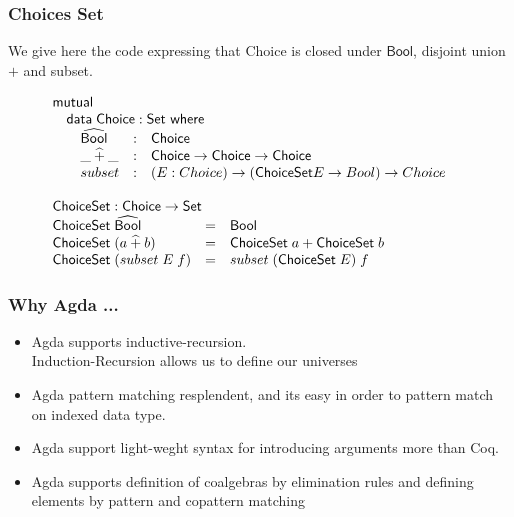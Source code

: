 \documentclass{beamer}
\newcommand{\ar}{\rightarrow}
\newcommand{\datarm}{\mathsf{data}}
\newcommand{\wheresf}{\mathsf{where}}
\newcommand{\Set}{\mathsf{Set}}
\newcommand{\mutual}{\mathsf{mutual}}
\newcommand{\Choice}{\mathsf{Choice}}
\newcommand{\ChoiceSet}{\mathsf{ChoiceSet}}
\newcommand{\Bool}{\mathsf{Bool}}
\newcommand{\Boolhat}{\widehat{\mathsf{Bool}}}
\newcommand{\plushat}{\mathbin{\widehat{+}}}
\begin{document}
\begin{frame}
\frametitle{Choices Set}

We give here the code expressing that Choice is closed under $\Bool$, disjoint union $+$ and subset.



\[\begin{array}[t]{@{}l} 
\mutual\\
\mbox{\quad}
\begin{array}[t]{@{}l} 
\datarm\;\Choice : \Set\ \wheresf\\
\mbox{\quad} \begin{array}[t]{@{}lcl} 
\Boolhat &: & \Choice\\
\_\plushat\_ &:& \Choice \ar \Choice \ar \Choice\\
subset &:& (E : Choice) \ar  (\ChoiceSet E \ar Bool) \ar Choice
\end{array} \end{array} \\
\\
\ChoiceSet : \Choice  \ar \Set \\
\begin{array}[t]{@{}lcl} 
\ChoiceSet\;\Boolhat &=& \Bool\\
\ChoiceSet\;(a \plushat b) &=& 
\ChoiceSet\;a + \ChoiceSet\;b \\
\ChoiceSet\;(subset\; E\; f) &=& subset\; (\ChoiceSet\; E)\; f

\end{array} 
\end{array} 
\]

\end{frame}


\begin{frame}
\frametitle{Why Agda ... }
\begin{itemize}
 
\item Agda supports inductive-recursion. \\ {\footnotesize Induction-Recursion allows us to define our universes}



\item Agda pattern matching resplendent, and its easy in order to pattern match on indexed data type.

\item Agda support light-weght syntax for introducing arguments more than Coq.

\item Agda supports definition of coalgebras by elimination rules and defining elements by pattern and copattern matching

\end{itemize}
\end{frame}
\end{document}
